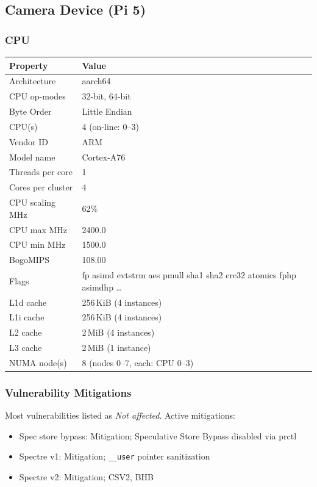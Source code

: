 \documentclass[11pt,letterpaper]{article}
\newcommand{\code}[1]{\texttt{#1}}
\begin{document}
\subsection{Camera Device (Pi 5)}

\subsubsection{CPU}

\begin{tabular}{@{}L{5cm}L{9cm}@{}}
\toprule
\textbf{Property} & \textbf{Value} \\
\midrule
Architecture    & aarch64 \\
CPU op-modes    & 32-bit, 64-bit \\
Byte Order      & Little Endian \\
CPU(s)          & 4 (on-line: 0--3) \\
Vendor ID       & ARM \\
Model name      & Cortex-A76 \\
Threads per core & 1 \\
Cores per cluster & 4 \\
CPU scaling MHz & 62\% \\
CPU max MHz     & 2400.0 \\
CPU min MHz     & 1500.0 \\
BogoMIPS        & 108.00 \\
Flags           & fp asimd evtstrm aes pmull sha1 sha2 crc32 atomics fphp asimdhp \ldots \\
L1d cache       & 256\,KiB (4 instances) \\
L1i cache       & 256\,KiB (4 instances) \\
L2 cache        & 2\,MiB (4 instances) \\
L3 cache        & 2\,MiB (1 instance) \\
NUMA node(s)    & 8 (nodes 0--7, each: CPU 0--3) \\
\bottomrule
\end{tabular}

\subsubsection{Vulnerability Mitigations}

Most vulnerabilities listed as \textit{Not affected}. Active mitigations:
\begin{itemize}[noitemsep]
    \item Spec store bypass: Mitigation; Speculative Store Bypass disabled via prctl
    \item Spectre v1: Mitigation; \code{\_\_user} pointer sanitization
    \item Spectre v2: Mitigation; CSV2, BHB
\end{itemize}
\end{document}
